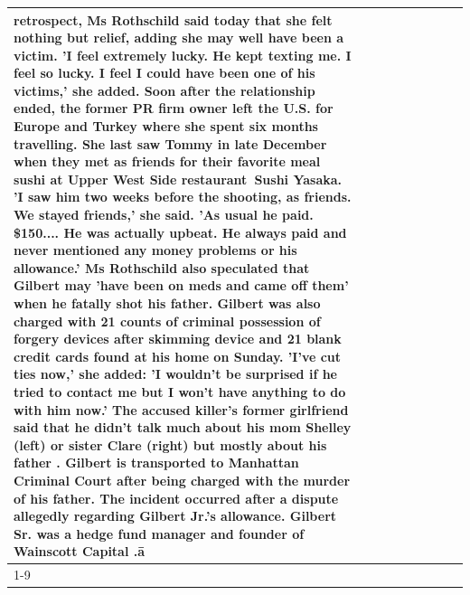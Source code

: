 \begin{table}[H]
\begin{tabular}{lllrlllll}
retrospect, Ms Rothschild said today that she felt nothing but relief, adding she may well have been a victim. 'I feel extremely lucky. He kept texting me. I feel so lucky. I feel I could have been one of his victims,' she added. Soon after the relationship ended, the former PR firm owner left the U.S. for Europe and Turkey where she spent six months  travelling. She last saw Tommy in late December when they met as friends for their favorite meal sushi at Upper West Side restaurant Sushi Yasaka. 'I saw him two weeks before the shooting, as friends. We stayed friends,' she said. 'As usual he paid. \$150.... He was actually upbeat. He always paid and never mentioned any money problems or his allowance.' Ms Rothschild also speculated that Gilbert may 'have been on meds and came off them' when he fatally shot his father. Gilbert was also charged with 21 counts of criminal possession of forgery devices after skimming device and 21 blank credit cards found at his home on Sunday. 'I've cut ties now,' she added: 'I wouldn’t be surprised if he tried to contact me but I won’t have anything to do with him now.' The accused killer's former girlfriend said that he didn't talk much about his mom Shelley (left) or sister Clare (right) but mostly about his father . Gilbert is transported to Manhattan Criminal Court  after being charged with the murder of his father. The incident occurred after a dispute allegedly regarding Gilbert Jr.'s allowance. Gilbert Sr. was a hedge fund manager and founder of Wainscott Capital .ā \\
\cline{1-9} \cline{2-9}

\end{tabular}
\end{table}
